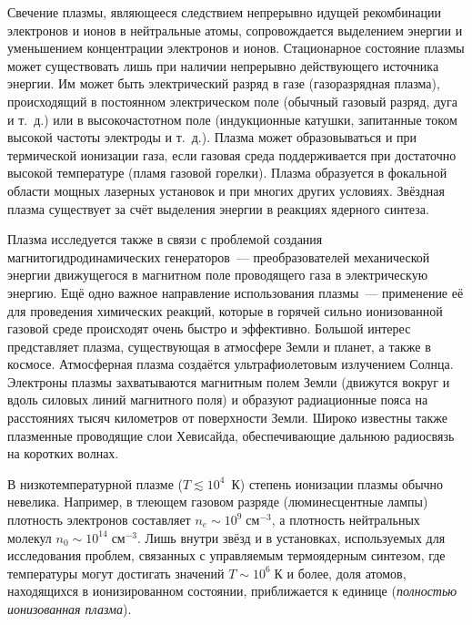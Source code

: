 Свечение плазмы, являющееся следствием непрерывно идущей
рекомбинации электронов и ионов в нейтральные атомы, сопровождается выделением
энергии и уменьшением концентрации электронов и ионов. Стационарное состояние
плазмы может существовать лишь при наличии непрерывно действующего источника
энергии. Им может быть электрический разряд в газе (газоразрядная плазма),
происходящий в постоянном электрическом поле (обычный газовый разряд,
дуга и т.~д.) или в высокочастотном поле (индукционные катушки,
запитанные током высокой частоты электроды и т.~д.).
Плазма может образовываться и при термической ионизации газа, если газовая среда
поддерживается при достаточно высокой температуре (пламя газовой
горелки). Плазма образуется в фокальной области мощных лазерных установок и при
многих других условиях. Звёздная плазма существует за счёт выделения энергии
в реакциях ядерного синтеза.

Плазма исследуется также в связи с проблемой создания магнитогидродинамических
генераторов~--- преобразователей
механической энергии движущегося в магнитном поле проводящего газа в
электрическую энергию. Ещё одно важное направление использования плазмы~---
применение её для проведения химических реакций, которые в горячей
сильно ионизованной газовой среде происходят очень быстро и эффективно.
Большой интерес представляет плазма, существующая в атмосфере Земли и планет, а
также в космосе. Атмосферная плазма создаётся ультрафиолетовым излучением
Солнца. Электроны плазмы захватываются магнитным полем Земли (движутся вокруг и
вдоль силовых линий магнитного поля) и образуют радиационные пояса на
расстояниях тысяч километров от поверхности Земли. Широко известны также
плазменные проводящие слои Хевисайда, обеспечивающие дальнюю радиосвязь
на коротких волнах.

В низкотемпературной плазме ($T\lesssim 10^4$~К) степень ионизации плазмы
обычно невелика. Например, в тлеющем газовом разряде (люминесцентные лампы)
плотность электронов составляет $n_e\sim 10^9\;\text{см}^{-3}$,
а плотность нейтральных молекул $n_0\sim 10^{14}\;\text{см}^{-3}$.
Лишь внутри звёзд и в установках, используемых для исследования проблем,
связанных с управляемым термоядерным синтезом,
где температуры могут достигать значений $T \sim 10^{6}\;К$ и более,
доля атомов, находящихся в ионизированном состоянии, приближается
к единице (\emph{полностью ионизованная плазма}).

